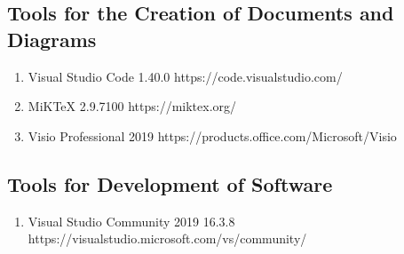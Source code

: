 \documentclass[12pt, letterpaper]{article}
\begin{document}
\subsection{Tools for the Creation of Documents and Diagrams}
\begin{enumerate}
    \item Visual Studio Code 1.40.0 https://code.visualstudio.com/
    \item MiKTeX 2.9.7100 https://miktex.org/
    \item Visio Professional 2019 https://products.office.com/Microsoft/Visio
\end{enumerate}
\subsection{Tools for Development of Software}
\begin{enumerate}
    \item Visual Studio Community 2019 16.3.8 https://visualstudio.microsoft.com/vs/community/
\end{enumerate}
\end{document}
